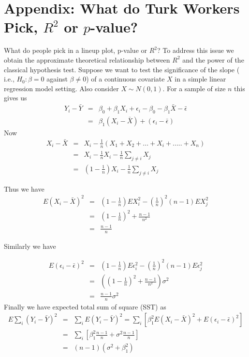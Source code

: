 \documentclass[11pt]{article}
\begin{document}
\section{Appendix: What do Turk Workers Pick, $R^2$ or $p$-value?} What do people pick in a lineup plot, p-value or $R^2$? To address this issue we obtain the approximate theoretical relationship between $R^2$ and the power of the classical hypothesis test. Suppose we want to test the significance of the slope ( i.e.,  $H_0: \beta=0$ against $\beta \ne 0$) of a continuous covariate $X$ in  a simple linear regression model setting. Also consider $X \sim N(0,1)$. For a sample of size $n$ this gives us 
\begin{eqnarray*}
Y_i-\bar{Y}& = & \beta_0+\beta_1X_i+\epsilon_i - \beta_0 - \beta_1 \bar{X}- \bar{\epsilon} \\
          & = & \beta_1(X_i-\bar{X})+(\epsilon_i-\bar{\epsilon})
\end{eqnarray*}
Now 
\begin{eqnarray*}
X_i-\bar{X}& = & X_i - \frac1n (X_1 + X_2 + ... + X_i + .....+ X_n) \\
          & = & X_i - \frac1n X_i - \frac1n \sum_{j \neq i}{X_j}\\
          & = & (1-\frac1n)X_i - \frac1n \sum_{j \neq i}{X_j}
\end{eqnarray*}

Thus we have 
\begin{eqnarray*}
E(X_i-\bar{X})^2 & = & (1-\frac1n)EX_i^2 - \left( \frac1n \right )^2 (n-1) EX_j^2 \\
                 & = & (1-\frac1n)^2+ \frac{n-1}{n^2}\\
                 & = & \frac{n-1}{n}
\end{eqnarray*}

Similarly we have 

\begin{eqnarray*}
E(\epsilon_i-\bar{\epsilon})^2 & = & (1-\frac1n)E\epsilon_i^2 - \left( \frac1n \right )^2 (n-1) E\epsilon_j^2 \\
                 & = & \left((1-\frac1n)^2+ \frac{n-1}{n^2} \right) \sigma^2 \\
                 & = & \frac{n-1}{n}\sigma^2
\end{eqnarray*}
Finally we have expected total sum of square (SST) as
\begin{eqnarray*}
E\sum_i{(Y_i-\bar{Y})^2} & = & \sum_i E(Y_i-\bar{Y})^2=\sum_i \left [ \beta_1^2 E(X_i-\bar{X})^2 + E(\epsilon_i-\bar{\epsilon})^2 \right] \\
                 & = & \sum_i\left[ \beta_1^2 \frac{n-1}{n}+  \sigma^2 \frac{n-1}{n}\right]\\
                 & = & (n-1)(\sigma^2+\beta_1^2)
\end{eqnarray*}
\end{document}
